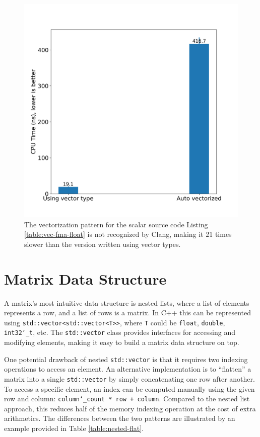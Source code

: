\documentclass[logo,bsc,singlespacing,parskip]{infthesis}
\newcommand{\dtint}{\texttt{int32\char`_t}}
\newcommand{\dtfloat}{\texttt{float}}
\newcommand{\dtdouble}{\texttt{double}}
\begin{document}
\begin{figure}[H]%
    \begin{center}
    \includegraphics[width=\linewidth]{image/plot_vectorization_method.png}
    \end{center}
    \caption{The vectorization pattern for the scalar source code Listing \ref{table:vec-fma-float} is not recognized by Clang, making it 21 times slower than the version written using vector types. }
    \label{plot_vectorization_method}
\end{figure}



\section{Matrix Data Structure}
\label{sec:mat-structure}
A matrix's most intuitive data structure is nested lists, where a list of elements represents a row, and a list of rows is a matrix. In C++ this can be represented using \texttt{std::vector<std::vector<T>>}, where \texttt{T} could be \dtfloat{}, \dtdouble{}, \dtint{}, etc. The \texttt{std::vector} class provides interfaces for accessing and modifying elements, making it easy to build a matrix data structure on top. 

One potential drawback of nested \texttt{std::vector} is that it requires two indexing operations to access an element. An alternative implementation is to “flatten” a matrix into a single \texttt{std::vector} by simply concatenating one row after another. To access a specific element, an index can be computed manually using the given row and column: \texttt{column\char`_count * row + column}. Compared to the nested list approach, this reduces half of the memory indexing operation at the cost of extra arithmetics. The differences between the two patterns are illustrated by an example provided in Table \ref{table:nested-flat}. 
\end{document}
